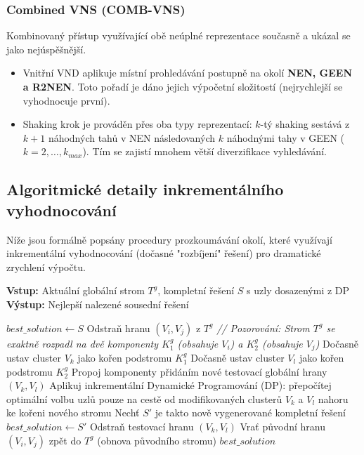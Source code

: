 \documentclass[12pt,a4paper]{article}
\theoremstyle{definition}
\begin{document}
\subsubsection{Combined VNS (COMB-VNS)}
Kombinovaný přístup využívající obě neúplné reprezentace současně a ukázal se jako nejúspěšnější. 
\begin{itemize}
    \item Vnitřní VND aplikuje místní prohledávání postupně na okolí \textbf{NEN, GEEN a R2NEN}. Toto pořadí je dáno jejich výpočetní složitostí (nejrychlejší se vyhodnocuje první).
    \item Shaking krok je prováděn přes oba typy reprezentací: $k$-tý shaking sestává z $k+1$ náhodných tahů v NEN následovaných $k$ náhodnými tahy v GEEN ($k=2, \dots, k_{max}$). Tím se zajistí mnohem větší diverzifikace vyhledávání.
\end{itemize}

\subsection{Algoritmické detaily inkrementálního vyhodnocování}

Níže jsou formálně popsány procedury prozkoumávání okolí, které využívají inkrementální vyhodnocování (dočasné "rozbíjení" řešení) pro dramatické zrychlení výpočtu.




\begin{algorithm}[H]
\caption{Prozkoumávání okolí GEEN (Výměna globální hrany v GESB-VNS)}
\textbf{Vstup:} Aktuální globální strom $T^g$, kompletní řešení $S$ s uzly dosazenými z DP \\
\textbf{Výstup:} Nejlepší nalezené sousední řešení
\begin{algorithmic}[1]
\STATE $best\_solution \gets S$
    \STATE Odstraň hranu $(V_i, V_j)$ z $T^g$
    \STATE \textit{// Pozorování: Strom $T^g$ se exaktně rozpadl na dvě komponenty $K_1^g$ (obsahuje $V_i$) a $K_2^g$ (obsahuje $V_j$)}
        \STATE Dočasně ustav cluster $V_k$ jako kořen podstromu $K_1^g$
            \STATE Dočasně ustav cluster $V_l$ jako kořen podstromu $K_2^g$
            \STATE Propoj komponenty přidáním nové testovací globální hrany $(V_k, V_l)$
            \STATE Aplikuj inkrementální Dynamické Programování (DP): přepočítej optimální volbu uzlů pouze na cestě od modifikovaných clusterů $V_k$ a $V_l$ nahoru ke kořeni nového stromu
            \STATE Nechť $S'$ je takto nově vygenerované kompletní řešení
                \STATE $best\_solution \gets S'$
            \ENDIF
            \STATE Odstraň testovací hranu $(V_k, V_l)$
        \ENDFOR
    \ENDFOR
    \STATE Vrať původní hranu $(V_i, V_j)$ zpět do $T^g$ (obnova původního stromu)
\ENDFOR
\RETURN $best\_solution$
\end{algorithmic}
\end{algorithm}
\end{document}
